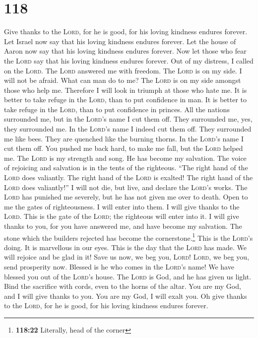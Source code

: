 \hypertarget{section-117}{%
\section{118}\label{section-117}}

 Give thanks to the \textsc{Lord}, for he is good, for his
loving kindness endures forever.  Let Israel now say that
his loving kindness endures forever.  Let the house of
Aaron now say that his loving kindness endures forever. 
Now let those who fear the \textsc{Lord} say that his loving kindness
endures forever.  Out of my distress, I called on the
\textsc{Lord}. The \textsc{Lord} answered me with freedom.
 The \textsc{Lord} is on my side. I will not be afraid.
What can man do to me?  The \textsc{Lord} is on my side
amongst those who help me. Therefore I will look in triumph at those who
hate me.  It is better to take refuge in the
\textsc{Lord}, than to put confidence in man.  It is
better to take refuge in the \textsc{Lord}, than to put confidence in
princes.  All the nations surrounded me, but in the
\textsc{Lord}'s name I cut them off.  They surrounded me,
yes, they surrounded me. In the \textsc{Lord}'s name I indeed cut them
off.  They surrounded me like bees. They are quenched
like the burning thorns. In the \textsc{Lord}'s name I cut them off.
 You pushed me back hard, to make me fall, but the
\textsc{Lord} helped me.  The \textsc{Lord} is my
strength and song. He has become my salvation.  The voice
of rejoicing and salvation is in the tents of the righteous. ``The right
hand of the \textsc{Lord} does valiantly.  The right hand
of the \textsc{Lord} is exalted! The right hand of the \textsc{Lord}
does valiantly!''  I will not die, but live, and declare
the \textsc{Lord}'s works.  The \textsc{Lord} has
punished me severely, but he has not given me over to death.
 Open to me the gates of righteousness. I will enter into
them. I will give thanks to the \textsc{Lord}.  This is
the gate of the \textsc{Lord}; the righteous will enter into it.
 I will give thanks to you, for you have answered me, and
have become my salvation.  The stone which the builders
rejected has become the cornerstone.\footnote{\textbf{118:22} Literally,
  head of the corner}  This is the \textsc{Lord}'s doing.
It is marvellous in our eyes.  This is the day that the
\textsc{Lord} has made. We will rejoice and be glad in it!
 Save us now, we beg you, \textsc{Lord}! \textsc{Lord},
we beg you, send prosperity now.  Blessed is he who comes
in the \textsc{Lord}'s name! We have blessed you out of the
\textsc{Lord}'s house.  The \textsc{Lord} is God, and he
has given us light. Bind the sacrifice with cords, even to the horns of
the altar.  You are my God, and I will give thanks to
you. You are my God, I will exalt you.  Oh give thanks to
the \textsc{Lord}, for he is good, for his loving kindness endures
forever.

